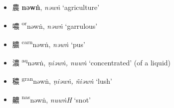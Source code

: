 

\begin{itemize}
    \item {\Large{農}} %
    {\large{\textbf{nəwṅ}}},
    \textit{nəwṅ} `agriculture' %

    \item {\Large{噥}} %
    {\large{{\textsuperscript{or}}nəwṅ}},
    \textit{nəwṅ} `garrulous' %

    \item {\Large{膿}} %
    {\large{{\textsuperscript{carn}}nəwṅ}},
    \textit{nəwṅ} `pus' %

    \item {\Large{濃}} %
    {\large{{\textsuperscript{aq}}nəwṅ}},
    \textit{ṇiəwṅ, nuwṅ} `concentrated' (of a liquid) %


    \item {\Large{穠}} %
    {\large{{\textsuperscript{gran}}nəwṅ}},
    \textit{ṇiəwṅ, ñiəwṅ} `lush' %



    \item {\Large{齈}} %
    {\large{{\textsuperscript{nas}}nəwṅ}},
    \textit{nuwṅH} `snot' %
\end{itemize}

